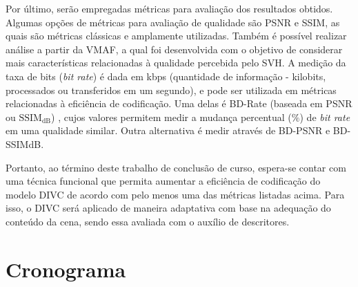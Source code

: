 Por último, serão empregadas métricas para avaliação dos resultados obtidos. 
Algumas opções de métricas para avaliação de qualidade são \ac{PSNR} e \ac{SSIM}, as quais são métricas clássicas e amplamente utilizadas. 
Também é possível realizar análise a partir da \ac{VMAF}, a qual foi desenvolvida com o objetivo de considerar mais características relacionadas à qualidade percebida pelo \ac{SVH}.
A medição da taxa de bits (\textit{bit rate}) é dada em kbps (quantidade de informação - kilobits, processados ou transferidos em um segundo), e pode ser utilizada em métricas relacionadas à eficiência de codificação. 
Uma delas é \ac{BD-Rate} (baseada em PSNR ou $\text{SSIM}_\text{dB}$) \cite{sullivan2001_bd}, cujos valores permitem medir a mudança percentual ($\%$) de \textit{bit rate} em uma qualidade similar. 
Outra alternativa é medir através de \ac{BD-PSNR} e \ac{BD-SSIMdB}.


Portanto, ao término deste trabalho de conclusão de curso, espera-se contar com uma técnica funcional que permita aumentar a eficiência de codificação do modelo \ac{DIVC} de acordo com pelo menos uma das métricas listadas acima. Para isso, o \ac{DIVC} será aplicado de maneira adaptativa com base na adequação do conteúdo da cena, sendo essa avaliada com o auxílio de descritores. 


\section{Cronograma}


